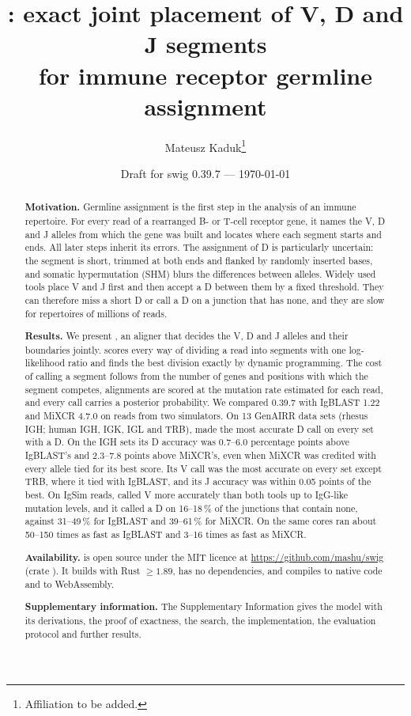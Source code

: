 \documentclass[11pt,a4paper]{article}
\title{\swig: exact joint placement of V, D and J segments\\
for immune receptor germline assignment}
\author{Mateusz Kaduk\thanks{Affiliation to be added.}%
}
\date{Draft for swig 0.39.7 --- \today}
\begin{document}
\maketitle

\begin{abstract}
\noindent\textbf{Motivation.}
Germline assignment is the first step in the analysis of an immune
repertoire. For every read of a rearranged B- or T-cell receptor gene, it
names the V, D and J alleles from which the gene was built and locates where
each segment starts and ends. All later steps inherit its errors. The
assignment of D is particularly uncertain: the segment is short, trimmed at
both ends and flanked by randomly inserted bases, and somatic hypermutation
(SHM) blurs the differences between alleles. Widely used tools place V and J first and
then accept a D between them by a fixed threshold. They can therefore miss a
short D or call a D on a junction that has none, and they are slow for
repertoires of millions of reads.

\noindent\textbf{Results.}
We present \swig, an aligner that decides the V, D and J alleles and their
boundaries jointly. \swig{} scores every way of dividing a read into
segments with one log-likelihood ratio and finds the best division exactly
by dynamic programming. The cost of calling a segment follows from the
number of genes and positions with which the segment competes, alignments
are scored at the mutation rate estimated for each read, and every call
carries a posterior probability. We compared \swig{} 0.39.7 with IgBLAST
1.22 and MiXCR 4.7.0 on reads from two simulators. On 13 GenAIRR data sets
(rhesus IGH; human IGH, IGK, IGL and TRB), \swig{} made the most accurate D
call on every set with a D. On the IGH sets its D accuracy was 0.7--6.0
percentage points above IgBLAST's and 2.3--7.8 points above MiXCR's, even
when MiXCR was credited with every allele tied for its best score. Its V
call was the most accurate on every set except TRB, where it tied with
IgBLAST, and its J accuracy was within 0.05 points of the best. On IgSim
reads, \swig{} called V more accurately than both tools up to IgG-like
mutation levels, and it called a D on 16--18\,\% of the junctions that
contain none, against 31--49\,\% for IgBLAST and 39--61\,\% for MiXCR. On
the same cores \swig{} ran about 50--150 times as fast as IgBLAST and 3--16
times as fast as MiXCR.

\noindent\textbf{Availability.}
\swig{} is open source under the MIT licence at
\url{https://github.com/mashu/swig} (crate ). It builds with
Rust $\geq 1.89$, has no dependencies, and compiles to native code and to
WebAssembly.

\noindent\textbf{Supplementary information.}
The Supplementary Information gives the model with its derivations, the
proof of exactness, the search, the implementation, the evaluation protocol
and further results.
\end{abstract}
\end{document}
